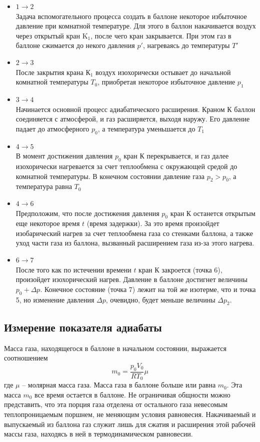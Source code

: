 \documentclass[a4paper,12pt]{article}
\theoremstyle{plain} %
\theoremstyle{definition} %
\theoremstyle{remark} %
\begin{document}
\begin{itemize}
	\item $1\rightarrow2$ \\Задача вспомогательного процесса создать в баллоне некоторое избыточное давление при комнатной температуре. Для этого в баллон накачивается воздух через открытый кран $\text{K}_1$, после чего кран закрывается. При этом газ в баллоне сжимается до некого давления $p'$, нагреваясь до температуры $T'$
	\item $2\rightarrow3$ \\После закрытия крана $\text{К}_1$ воздух изохорически остывает до начальной комнатной температуры $T_0$, приобретая некоторое избыточное давление $p_1$
	\item $3\rightarrow4$ \\ Начинается основной процесс адиабатического расширения. Краном $\text{К}$ баллон соединяется с атмосферой, и газ расширяется, выходя наружу. Его давление падает до атмосферного $p_0$, а температура уменьшается до $T_1$
	\item $4\rightarrow5$ \\ В момент достижения давления $p_0$ кран $\text{К}$  перекрывается, и газ далее изохорически нагревается за счет теплообмена с окружающей средой до комнатной температуры. В конечном состоянии давление газа $p_2 > p_0$, а температура равна $T_0$
	\item $4\rightarrow6$\\Предположим, что после достижения давления $p_0$ кран $\text{К}$ останется открытым еще некоторое время $t$ (время задержки). За это время произойдет изобарический нагрев  за счет теплообмена газа со стенками баллона, а также уход части газа из баллона, вызванный расширением газа из-за этого нагрева. 
	\item $6\rightarrow7$\\ После того как по истечении времени $t$ кран $\text{К}$ закроется (точка 6), произойдет изохорический нагрев. Давление в баллоне достигнет величины $p_0 + \Delta p$. Конечное состояние (точка 7) лежит на той же изотерме, что и точка 5, но изменение давления $\Delta p$, очевидно, будет меньше величины $\Delta p_2$.
\end{itemize}
\subsection {Измерение показателя адиабаты}
Масса газа, находящегося в баллоне в начальном состоянии, выражается соотношением
\begin{equation}
m_0 = \frac{p_0 V_0}{RT_0} \mu
\end{equation}
где $\mu$ -- молярная масса газа. Масса газа в баллоне больше или равна $m_0$. Эта масса $m_0$ все время остается в баллоне. Не ограничивая общности можно представить, что эта порция газа отделена от остального газа невесомым теплопроницаемым поршнем, не меняющим условия равновесия. Накачиваемый и выпускаемый из баллона газ служит лишь для сжатия и расширения этой рабочей массы газа, находясь в ней в термодинамическом равновесии.
\end{document}
